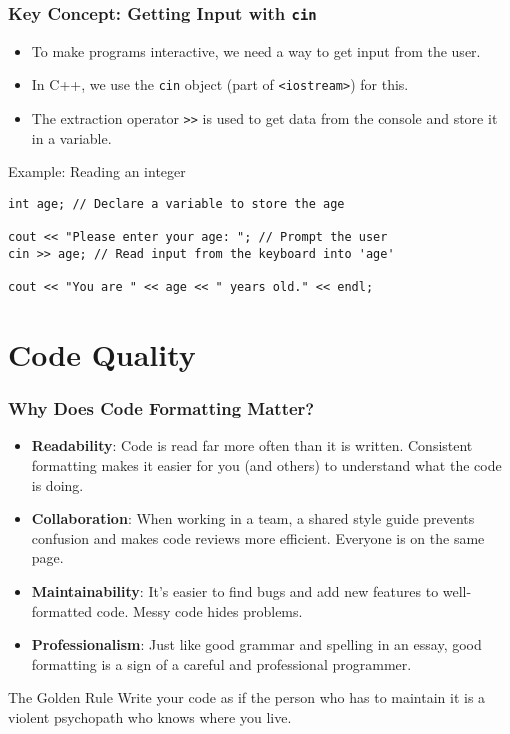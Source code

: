 \documentclass{beamer}
\begin{document}
\begin{frame}[fragile]
\frametitle{Key Concept: Getting Input with \texttt{cin}}
\begin{itemize}
    \item To make programs interactive, we need a way to get input from the user.
    \item In C++, we use the \texttt{cin} object (part of \texttt{<iostream>}) for this.
    \item The extraction operator \texttt{>>} is used to get data from the console and store it in a variable.
\end{itemize}
\pause
\begin{block}{Example: Reading an integer}
\begin{verbatim}
int age; // Declare a variable to store the age

cout << "Please enter your age: "; // Prompt the user
cin >> age; // Read input from the keyboard into 'age'

cout << "You are " << age << " years old." << endl;
\end{verbatim}
\end{block}
\end{frame}

\section{Code Quality}

\begin{frame}
\frametitle{Why Does Code Formatting Matter?}
\begin{itemize}
    \item \textbf{Readability}: Code is read far more often than it is written. Consistent formatting makes it easier for you (and others) to understand what the code is doing.
    \pause
    \item \textbf{Collaboration}: When working in a team, a shared style guide prevents confusion and makes code reviews more efficient. Everyone is on the same page.
    \pause
    \item \textbf{Maintainability}: It's easier to find bugs and add new features to well-formatted code. Messy code hides problems.
    \pause
    \item \textbf{Professionalism}: Just like good grammar and spelling in an essay, good formatting is a sign of a careful and professional programmer.
\end{itemize}
\vspace{1em}
\begin{alertblock}{The Golden Rule}
Write your code as if the person who has to maintain it is a violent psychopath who knows where you live.
\end{alertblock}
\end{frame}
\end{document}
